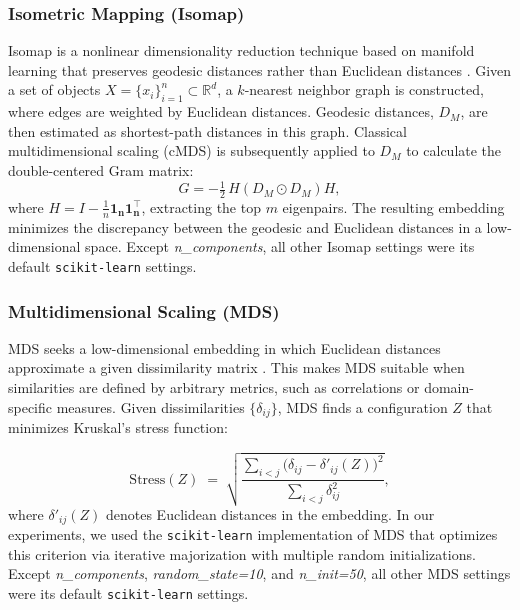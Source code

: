 \documentclass[preprint,12pt]{elsarticle}
\begin{document}
\subsubsection{Isometric Mapping (Isomap)}

Isomap is a nonlinear dimensionality reduction technique based on manifold learning that preserves geodesic distances rather than Euclidean distances \cite{tenenbaum2000isomap}. Given a set of objects $X = \{x_i\}_{i=1}^n \subset \mathbb{R}^d$, a $k$-nearest neighbor graph is constructed, where edges are weighted by Euclidean distances. Geodesic distances, $D_M$, are then estimated as shortest-path distances in this graph. Classical multidimensional scaling (cMDS) is subsequently applied to $D_M$ to calculate the double-centered Gram matrix:
\begin{equation}
    G = -\tfrac{1}{2}\, H (D_M \odot D_M) H,
\end{equation}
where $H = I - \tfrac{1}{n}\mathbf{1_n}\mathbf{1_n^\top}$, extracting the top $m$ eigenpairs. The resulting embedding minimizes the discrepancy between the geodesic and Euclidean distances in a low-dimensional space. Except \textit{n\_components}, all other Isomap settings were its default \texttt{scikit-learn} settings. 

\subsubsection{Multidimensional Scaling (MDS)}
MDS seeks a low-dimensional embedding in which Euclidean distances approximate a given dissimilarity matrix \cite{kruskal1964multidimensional}. This makes MDS suitable when similarities are defined by arbitrary metrics, such as correlations or domain-specific measures. Given dissimilarities $\{\delta_{ij}\}$, MDS finds a configuration $Z$ that minimizes Kruskal’s stress function:
 
 \begin{equation}
\mathrm{Stress}(Z) \;=\; \sqrt{\frac{\sum_{i<j} \big(\delta_{ij} - \delta'_{ij}(Z)\big)^2}{\sum_{i<j} \delta_{ij}^2}},
\end{equation}
where $\delta'_{ij}(Z)$ denotes Euclidean distances in the embedding. In our experiments, we used the \texttt{scikit-learn} implementation of MDS that optimizes this criterion via iterative majorization with multiple random initializations. Except \textit{n\_components}, \textit{random\_state=10}, and \textit{n\_init=50}, all other MDS settings were its default \texttt{scikit-learn} settings.
\end{document}
